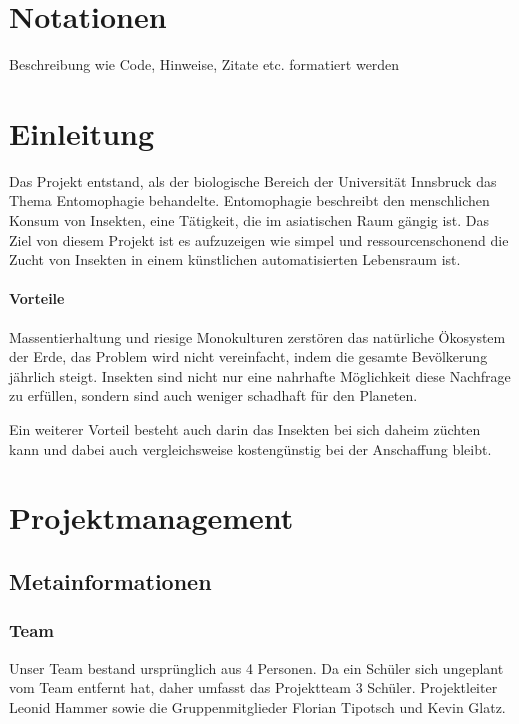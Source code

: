 \def \currentAuthor {} %

\chapter*{Notationen}
Beschreibung wie Code, Hinweise, Zitate etc. formatiert werden  

\chapter{Einleitung}

Das Projekt entstand, als der biologische Bereich der Universität Innsbruck das Thema Entomophagie behandelte. Entomophagie beschreibt den menschlichen Konsum von Insekten, eine Tätigkeit, die im asiatischen Raum gängig ist. Das Ziel von diesem Projekt ist es aufzuzeigen wie simpel und ressourcenschonend die Zucht von Insekten in einem künstlichen automatisierten Lebensraum ist.

\subsubsection{Vorteile}
Massentierhaltung und riesige Monokulturen zerstören das natürliche Ökosystem der Erde, das Problem wird nicht vereinfacht, indem die gesamte Bevölkerung jährlich steigt. Insekten sind nicht nur eine nahrhafte Möglichkeit diese Nachfrage zu erfüllen, sondern sind auch weniger schadhaft für den Planeten.

Ein weiterer Vorteil besteht auch darin das Insekten bei sich daheim züchten kann und dabei auch vergleichsweise kostengünstig bei der Anschaffung bleibt.




\chapter{Projektmanagement}

\section{Metainformationen}

\subsection{Team}
Unser Team bestand ursprünglich aus 4 Personen. Da ein Schüler sich ungeplant vom Team entfernt hat, daher umfasst das Projektteam 3 Schüler. Projektleiter Leonid Hammer sowie die Gruppenmitglieder Florian Tipotsch und Kevin Glatz.



